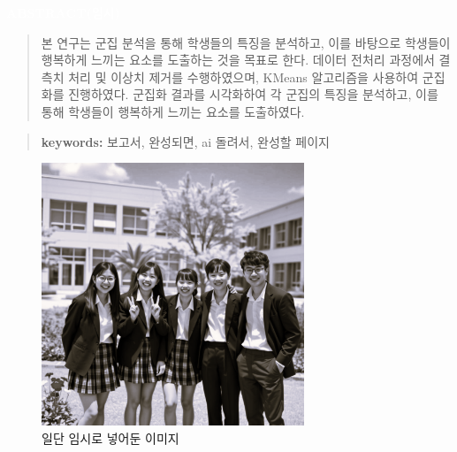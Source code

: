 

\begin{center}
    \thispagestyle{empty}
    {\fontsize{28}{34}\selectfont\textbf{\textcolor{white}{ABSTRACT(임시)}}}
    \vspace*{4.5cm}

    \begin{minipage}{0.85\textwidth}
        \begin{quote}
            \setlength{\parskip}{0.5em}
            본 연구는 군집 분석을 통해 학생들의 특징을 분석하고, 이를 바탕으로 학생들이 행복하게 느끼는 요소를 도출하는 것을 목표로 한다. 데이터 전처리 과정에서 결측치 처리 및 이상치 제거를 수행하였으며, KMeans 알고리즘을 사용하여 군집화를 진행하였다. 군집화 결과를 시각화하여 각 군집의 특징을 분석하고, 이를 통해 학생들이 행복하게 느끼는 요소를 도출하였다.
        \end{quote}
    \end{minipage}

    \vspace{0.5cm}

    \begin{minipage}{0.85\textwidth}
        \begin{quote}
            \setlength{\parskip}{0.5em}
            \textbf{keywords:} 보고서, 완성되면, ai 돌려서, 완성할 페이지
        \end{quote}
    \end{minipage}

    \vspace{0.5cm}

    \begin{figure}[h]
        \centering
        \includegraphics[width=0.7\textwidth]{img/2025-05-10-13-58-38.png}
        \caption*{\small 일단 임시로 넣어둔 이미지}
    \end{figure}
\end{center}
